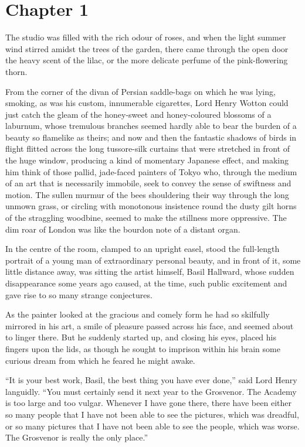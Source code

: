 \section{Chapter 1}

The studio was filled with the rich odour of roses, and when the light summer wind stirred amidst the trees of the garden, there came through the open door the heavy scent of the lilac, or the more delicate perfume of the pink-flowering thorn.

From the corner of the divan of Persian saddle-bags on which he was lying, smoking, as was his custom, innumerable cigarettes, Lord Henry Wotton could just catch the gleam of the honey-sweet and honey-coloured blossoms of a laburnum, whose tremulous branches seemed hardly able to bear the burden of a beauty so flamelike as theirs; and now and then the fantastic shadows of birds in flight flitted across the long tussore-silk curtains that were stretched in front of the huge window, producing a kind of momentary Japanese effect, and making him think of those pallid, jade-faced painters of Tokyo who, through the medium of an art that is necessarily immobile, seek to convey the sense of swiftness and motion. The sullen murmur of the bees shouldering their way through the long unmown grass, or circling with monotonous insistence round the dusty gilt horns of the straggling woodbine, seemed to make the stillness more oppressive. The dim roar of London was like the bourdon note of a distant organ.

In the centre of the room, clamped to an upright easel, stood the full-length portrait of a young man of extraordinary personal beauty, and in front of it, some little distance away, was sitting the artist himself, Basil Hallward, whose sudden disappearance some years ago caused, at the time, such public excitement and gave rise to so many strange conjectures.

As the painter looked at the gracious and comely form he had so skilfully mirrored in his art, a smile of pleasure passed across his face, and seemed about to linger there. But he suddenly started up, and closing his eyes, placed his fingers upon the lids, as though he sought to imprison within his brain some curious dream from which he feared he might awake.

“It is your best work, Basil, the best thing you have ever done,” said Lord Henry languidly. “You must certainly send it next year to the Grosvenor. The Academy is too large and too vulgar. Whenever I have gone there, there have been either so many people that I have not been able to see the pictures, which was dreadful, or so many pictures that I have not been able to see the people, which was worse. The Grosvenor is really the only place.”

